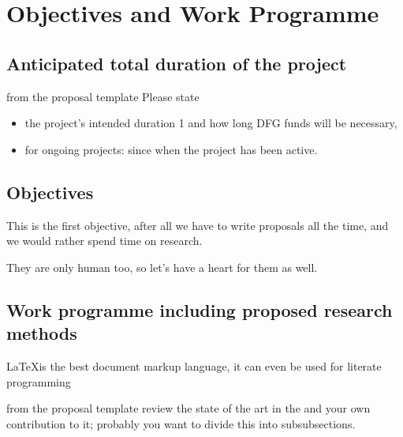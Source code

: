\section{Objectives and Work Programme }

\subsection{Anticipated total duration of the project }

\begin{todo}{from the proposal template}
Please state
\begin{itemize}
 \item the project's intended duration 1 and how long DFG funds will be necessary,
 \item for ongoing projects: since when the project has been active.
\end{itemize}
\end{todo}

\subsection{Objectives }

\begin{objective}[id=firstobj,title=Supporting Authors]
  This is the first objective, after all we have to write proposals all the time, and we
  would rather spend time on research. 
\end{objective}

\begin{objective}[id=secondobj,title=Supporting Reviewers]
  They are only human too, so let's have a heart for them as well. 
\end{objective}


\subsection{Work programme including proposed research methods }

\LaTeX is the best document markup language, it can even be used for literate
programming~\cite{DK:LP,Lamport:ladps94,Knuth:ttb84}
\begin{todo}{from the proposal template}
 review the state of the art in the and your own contribution to it; probably you want to
  divide this into subsubsections. 
\end{todo}

